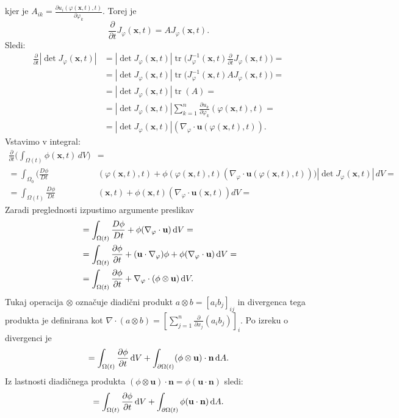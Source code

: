 \documentclass[mat2, tisk]{fmfdelo}
\newcommand{\bd}{\textbf}
\begin{document}
\begin{dokaz}
kjer je $A_{ik} = \frac{\partial u_i(\varphi(\bd{x}, t), t)}{\partial \varphi_k}$. Torej je 
$$
\frac{\partial}{\partial t} J_\varphi(\bd{x}, t) = A J_\varphi(\bd{x}, t).
$$
Sledi:
\begin{align*}
\frac{\partial}{\partial t} |\det{J_\varphi(\bd{x}, t)}| &= |\det{J_\varphi(\bd{x}, t)}| \operatorname{tr}\Big(J_\varphi^{-1}(\bd{x}, t) \frac{\partial}{\partial t} J_\varphi(\bd{x}, t)\Big) = \\
&= |\det{J_\varphi(\bd{x}, t)}| \operatorname{tr}\Big(J_\varphi^{-1}(\bd{x}, t) A J_\varphi(\bd{x}, t)\Big) = \\
&= |\det{J_\varphi(\bd{x}, t)}| \operatorname{tr}(A) = \\
&= |\det{J_\varphi(\bd{x}, t)}| \sum_{k=1}^{n} \frac{\partial u_k}{\partial \varphi_k}(\varphi(\bd{x}, t), t) = \\
&= |\det{J_\varphi(\bd{x}, t)}| (\nabla_\varphi \cdot \bd{u}(\varphi(\bd{x}, t), t)).
\end{align*}
Vstavimo v integral:
\begin{align*}
\frac{\partial}{\partial t} \Big(\int_{\Omega(t)} \phi(\mathbf{x},t)\, dV\Big) &= \\
=\int_{\Omega_0} \Big(\frac{D \phi}{D t}&(\varphi(\bd{x}, t), t) + \phi(\varphi({\mathbf{x}},t), t)(\nabla_\varphi \cdot \bd{u}(\varphi(\bd{x}, t), t)) \Big) |\det{J_\varphi(\bd{x}, t)}| \, dV =\\
= \int_{\Omega(t)} \frac{D \phi}{D t}&(\bd{x}, t) + \phi(\bd{x},t)(\nabla_\varphi \cdot \bd{u}(\bd{x}, t)) dV = 
\end{align*}
Zaradi preglednosti izpustimo argumente preslikav
\begin{align*}
&= \int_{\Omega(t)} \frac{D \phi}{D t} + \phi(\nabla_\varphi \cdot \bd{u}) \dif V = \\
&= \int_{\Omega(t)} \frac{\partial \phi}{\partial t} + (\bd{u} \cdot \nabla_\varphi) \phi + \phi(\nabla_\varphi \cdot \bd{u}) \dif V = \\
&= \int_{\Omega(t)} \frac{\partial \phi}{\partial t} + \nabla_\varphi \cdot (\phi \otimes \bd{u}) \dif V.
\end{align*}
Tukaj operacija $\otimes$ označuje diadični produkt $a\otimes b = [a_i b_j]_{ij}$ in divergenca 
tega produkta je definirana kot $\nabla \cdot (a \otimes b) = [\sum_{j=1}^n \frac{\partial}{\partial x_j} (a_i b_j)]_i$.
Po izreku o divergenci je
\begin{align*}
= \int_{\Omega(t)} \frac{\partial \phi}{\partial t} \dif V + \int_{\partial\Omega(t)} (\phi \otimes \bd{u}) \cdot \bd{n} \dif A.
\end{align*}
Iz lastnosti diadičnega produkta $(\phi \otimes \bd{u}) \cdot \bd{n} = \phi (\bd{u} \cdot \bd{n})$ sledi: 
\begin{align*}
  = \int_{\Omega(t)} \frac{\partial \phi}{\partial t} \dif V + \int_{\partial\Omega(t)} \phi (\bd{u} \cdot \bd{n}) \dif A.
\end{align*}
\end{dokaz}
\end{document}
